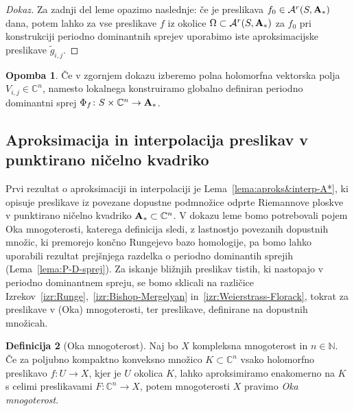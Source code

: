 \documentclass[12pt,a4paper,twoside]{article}
\theoremstyle{definition} %
\newtheorem{definicija}{Definicija}[section]
\newtheorem{opomba}[definicija]{Opomba}
\newenvironment{dokaz}[1][Dokaz]{\begin{proof}[#1]}{\end{proof}}
\theoremstyle{plain} %
\numberwithin{equation}{section}  %
\begin{document}
\begin{dokaz}
Za zadnji del leme opazimo naslednje: če je preslikava $f_{0} \in \mathcal{A}^{r}(S, \textbf{\textup{A}}_{*})$ dana, potem lahko za vse preslikave $f$ iz okolice $\Omega \subset \mathcal{A}^{r}(S, \textbf{\textup{A}}_{*})$ za $f_{0}$ pri konstrukciji periodno dominantnih sprejev uporabimo iste aproksimacijske preslikave $\tilde{g}_{i,j}$.
\end{dokaz}

\begin{opomba} \label{op:PDS-globalno}
Če v zgornjem dokazu izberemo polna holomorfna vektorska polja $V_{i,j} \in \mathbb{C}^{n}$, namesto lokalnega konstruiramo globalno definiran periodno dominantni sprej $\Phi_{f} \colon S \times \mathbb{C}^{n} \to \textbf{\textup{A}}_{*}$.
\end{opomba}

\subsection{Aproksimacija in interpolacija preslikav v punktirano ničelno kvadriko}
%
Prvi rezultat o aproksimaciji in interpolaciji je Lema~\ref{lema:aproks&interp-A*}, ki opisuje preslikave iz povezane dopustne podmnožice odprte Riemannove ploskve v punktirano ničelno kvadriko $\textbf{\textup{A}}_{*} \subset \mathbb{C}^{n}$.
V dokazu leme bomo potrebovali pojem Oka mnogoterosti, katerega definicija sledi, z lastnostjo povezanih dopustnih množic, ki premorejo končno Rungejevo bazo homologije, pa bomo lahko uporabili rezultat prejšnjega razdelka o periodno dominantih sprejih (Lema~\ref{lema:P-D-sprej}).
Za iskanje bližnjih preslikav tistih, ki nastopajo v periodno dominantnem spreju, se bomo sklicali na različice Izrekov~\ref{izr:Runge},~\ref{izr:Bishop-Mergelyan} in~\ref{izr:Weierstrass-Florack}, tokrat za preslikave v (Oka) mnogoterosti, %
ter preslikave, definirane na dopustnih množicah. %

\begin{definicija} [Oka mnogoterost]
Naj bo $X$ kompleksna mnogoterost in $n \in \mathbb{N}$. Če za poljubno kompaktno konveksno množico $K \subset \mathbb{C}^{n}$ vsako holomorfno preslikavo $f \colon U \to X$, kjer je $U$ okolica $K$, lahko aproksimiramo enakomerno na $K$ s celimi preslikavami $F \colon \mathbb{C}^{n} \to X$, potem mnogoterosti $X$ pravimo \emph{Oka mnogoterost}.
\end{definicija}
\end{document}
